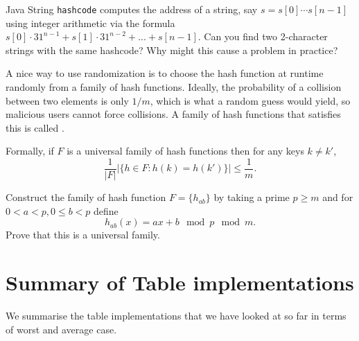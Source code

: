 \begin{Boxample}[4]
\item Java String \texttt{hashcode} computes the address of a string, say 
$s=s[0]\cdots s[n-1]$ using integer arithmetic via the formula 
$s[0] \cdot 31^{n-1} + s[1] \cdot 31^{n-2} + ... + s[n-1]$. Can you find two 2-character strings with the same hashcode? 
Why might this cause a problem in practice?
\end{Boxample}

A nice way to use randomization is to choose the hash function at runtime randomly from a family of hash functions.
Ideally,  the probability of a collision between two elements is only $1/m$, which is what a random guess would yield, so malicious users cannot 
force collisions. A family of hash functions that satisfies this is called .

Formally, if $F$ is a universal family of hash functions then for any keys $k\neq k'$,
$$
\frac{1}{|F|} \left|\{ h\in F : h(k) = h(k') \}\right| \leq \frac{1}{m}.
$$

\begin{Boxample}[18]
Construct the family of hash function $F = \{ h_{ab} \}$ by taking a prime $p\geq m$  and for $0<a <p, 0\leq b < p$ define 
$$h_{ab}(x) = ax+b \mod p \mod m\text{.}$$ 
Prove that this is a universal family.

\end{Boxample}


\section{Summary of Table implementations}

We summarise the table implementations that we have looked at so far in terms of worst and average case.

